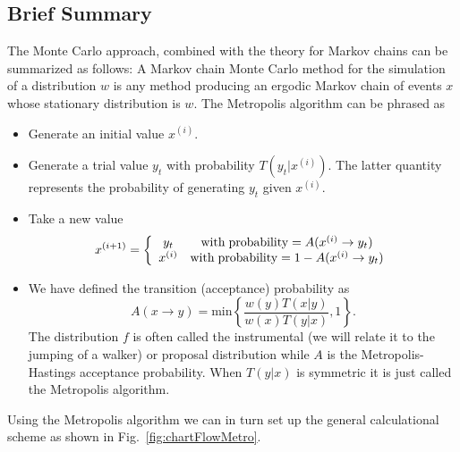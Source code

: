 \subsection{Brief Summary}
The Monte Carlo approach, combined with the theory for Markov chains can be summarized as follows:
A Markov chain Monte Carlo method for the simulation of a distribution $w$ is any method producing an 
ergodic Markov chain of events $x$ whose stationary distribution is $w$. The Metropolis algorithm can be phrased as
\begin{svgraybox}
\begin{itemize}
\item Generate an initial value $x^{(i)}$.
\item Generate a trial value $y_t$ with probability $T(y_t|x^{(i)})$. The latter quantity represents the probability of generating $y_t$ given $x^{(i)}$.
\item Take a new value 
\[ 
x^{(i+1)}= \left\{\begin{array}{cc} y_t & \mathrm{with\hspace{0.1cm}probability} = A(x^{(i)}\rightarrow y_t) \\
                                          x^{(i)}    & \mathrm{with \hspace{0.1cm}probability} = 1-A(x^{(i)}\rightarrow y_t)\end{array}\right .
\] 
\item We have defined the transition (acceptance) probability as 
\[
   A(x\rightarrow y)= \mathrm{min}\left\{\frac{w(y)T(x|y)}{w(x)T(y|x)},1\right\}.
\]
The distribution $f$ is often called the instrumental (we will relate it to the 
jumping of a walker) or proposal distribution while $A$ is the Metropolis-Hastings
acceptance probability.  When $T(y|x)$ is symmetric it is just called the Metropolis algorithm.
\end{itemize}
\end{svgraybox}
Using the Metropolis algorithm we can in turn set up the general calculational scheme as 
shown in Fig.~\ref{fig:chartFlowMetro}.
